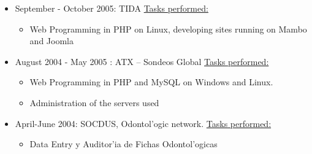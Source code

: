 \begin{itemize}
	\item September - October 2005: TIDA
		\subitem \underline{Tasks performed:}
			\begin{itemize}
				\item Web Programming in PHP on Linux, developing sites running on Mambo and Joomla
			\end{itemize}

	\item August 2004 - May 2005 : ATX -- Sondeos Global
		\subitem \underline{Tasks performed:}
			\begin{itemize}
				\item Web Programming in PHP and MySQL on Windows and Linux.
				\item Administration of the servers used
			\end{itemize}

	\item April-June 2004: SOCDUS, Odontol'ogic network.
		\subitem \underline{Tasks performed:}
			\begin{itemize}
				\item Data Entry y Auditor'ia de Fichas Odontol'ogicas
			\end{itemize}
\end{itemize}

